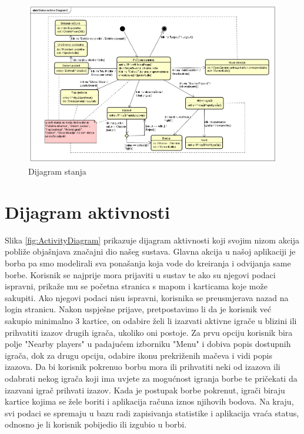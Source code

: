 			\begin{figure}[H]
        			\includegraphics[width=\textwidth]{slike/dijagramStanja.png}
        			\centering
        			\caption{Dijagram stanja}
        			\label{fig:StateMachineDiagram}
        		\end{figure}
			
			\eject 
		
		\section{Dijagram aktivnosti}
			
			
			
			Slika \ref{fig:ActivityDiagram} prikazuje dijagram aktivnosti koji svojim nizom akcija pobliže objašnjava značajni dio našeg sustava. Glavna akcija u našoj aplikaciji je borba pa smo modelirali sva ponašanja koja vode do kreiranja i odvijanja same borbe. Korisnik se najprije mora prijaviti u sustav te ako su njegovi podaci ispravni, prikaže mu se početna stranica s mapom i karticama koje može sakupiti. Ako njegovi podaci nisu ispravni, korisnika se preusmjerava nazad na login stranicu. Nakon uspješne prijave, pretpostavimo li da je korisnik već sakupio minimalno 3 kartice, on odabire želi li izazvati aktivne igrače u blizini ili prihvatiti izazov drugih igrača, ukoliko oni postoje. Za prvu opciju korisnik bira polje "Nearby players" u padajućem izborniku "Menu" i dobiva popis dostupnih igrača, dok za drugu opciju, odabire ikonu prekriženih mačeva i vidi popis izazova. Da bi korisnik pokrenuo borbu mora ili prihvatiti neki od izazova ili odabrati nekog igrača koji ima uvjete za mogućnost igranja borbe te pričekati da izazvani igrač prihvati izazov. Kada je postupak borbe pokrenut, igrači biraju kartice kojima se žele boriti i aplikacija računa iznos njihovih bodova. Na kraju, svi podaci se spremaju u bazu radi zapisivanja statistike i aplikacija vraća status, odnosno je li korisnik pobijedio ili izgubio u borbi.

